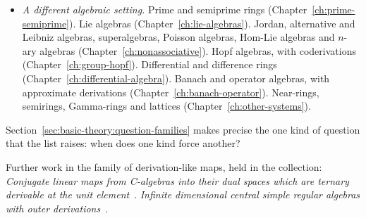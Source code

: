 \begin{itemize}
file lists every name with its count. Each chapter defines its kinds from the
sources it cites.
\item \emph{A different algebraic setting.} Prime and semiprime rings
(Chapter~\ref{ch:prime-semiprime}). Lie algebras
(Chapter~\ref{ch:lie-algebras}). Jordan, alternative and Leibniz algebras,
superalgebras, Poisson algebras, Hom-Lie algebras and $n$-ary algebras
(Chapter~\ref{ch:nonassociative}). Hopf algebras, with coderivations
(Chapter~\ref{ch:group-hopf}). Differential and difference rings
(Chapter~\ref{ch:differential-algebra}). Banach and operator algebras, with
approximate derivations (Chapter~\ref{ch:banach-operator}). Near-rings, semirings,
Gamma-rings and lattices (Chapter~\ref{ch:other-systems}).
\end{itemize}

Section~\ref{sec:basic-theory:question-families} makes precise the one kind of
question that the list raises: when does one kind force another?

Further work in the family of derivation-like maps, held in the collection:
\noindent\emph{Conjugate linear maps from C-algebras into their dual spaces
which are ternary derivable at the unit
element}~\cite{LibConjugateLinearMapsFrom2020}. \noindent\emph{Infinite
dimensional central simple regular algebras with outer
derivations}~\cite{LibInfiniteDimensionalCentralSimple2020}.
